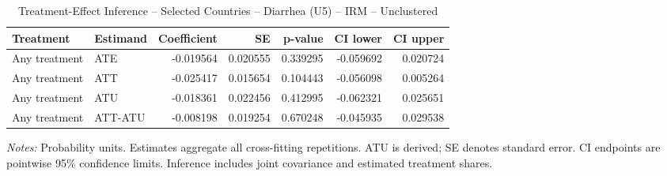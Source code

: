 \begin{table}[htbp]
\centering
\caption{Treatment-Effect Inference -- Selected Countries -- Diarrhea (U5) -- IRM -- Unclustered}
\label{tab:inference-diarrhea-IRM-iid-selected-countries}
\scriptsize
\begin{adjustbox}{max width=\linewidth}
\begin{tabular}{llrrrrr}
\toprule
Treatment & Estimand & Coefficient & SE & p-value & CI lower & CI upper \\
\midrule
Any treatment & ATE & -0.019564 & 0.020555 & 0.339295 & -0.059692 & 0.020724 \\
Any treatment & ATT & -0.025417 & 0.015654 & 0.104443 & -0.056098 & 0.005264 \\
Any treatment & ATU & -0.018361 & 0.022456 & 0.412995 & -0.062321 & 0.025651 \\
Any treatment & ATT-ATU & -0.008198 & 0.019254 & 0.670248 & -0.045935 & 0.029538 \\
\bottomrule
\end{tabular}

\end{adjustbox}
\par\smallskip
\begin{minipage}{\linewidth}\scriptsize \textit{Notes:} Probability units. Estimates aggregate all cross-fitting repetitions. ATU is derived; SE denotes standard error. CI endpoints are pointwise 95\% confidence limits. Inference includes joint covariance and estimated treatment shares. \end{minipage}
\end{table}

